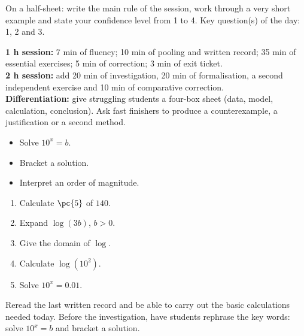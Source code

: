 \begin{exitticket}[3 minutes]On a half-sheet: write the main rule of the session, work through a very short example and state your confidence level from 1 to 4. Key question(s) of the day: 1, 2 and 3.\end{exitticket}

\ifmxteacher
\begin{method}
\textbf{1 h session:} 7 min of fluency; 10 min of pooling and written record; 35 min of essential exercises; 5 min of correction; 3 min of exit ticket.\\
\textbf{2 h session:} add 20 min of investigation, 20 min of formalisation, a second independent exercise and 10 min of comparative correction.\\
\textbf{Differentiation:} give struggling students a four-box sheet (data, model, calculation, conclusion). Ask fast finishers to produce a counterexample, a justification or a second method.
\end{method}
\fi
{}
\begin{objectives}\begin{itemize}\item Solve $10^x=b$.\item Bracket a solution.\item Interpret an order of magnitude.\end{itemize}\end{objectives}
\begin{fluency}\begin{enumerate}\item Calculate $\pc{5}$ of $140$. \item Expand $\log(3b)$, $b>0$. \item Give the domain of $\log$. \mxblank{$]0,+\infty[$}\item Calculate $\log(10^2)$. \item Solve $10^x=\num{0,01}$. \end{enumerate}\end{fluency}
\begin{prerequisites}Reread the last written record and be able to carry out the basic calculations needed today. Before the investigation, have students rephrase the key words: solve $10^x=b$ and bracket a solution.\end{prerequisites}


